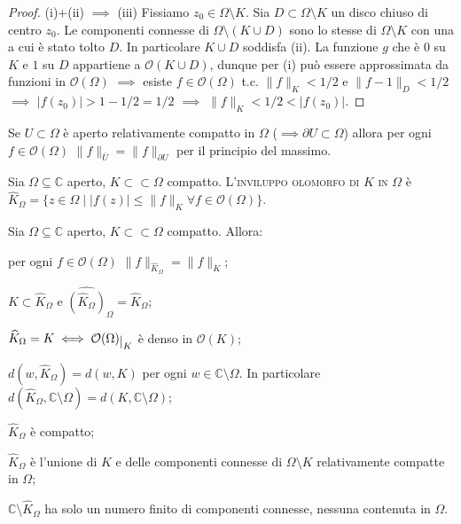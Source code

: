 \begin{proof}
  (i)+(ii) $\implies$ (iii) Fissiamo $z_0 \in \Omega \setminus K$. Sia $D \subset \Omega \setminus K$ un disco chiuso di centro $z_0$. Le componenti connesse di $\Omega \setminus (K \cup D)$ sono lo stesse di $\Omega \setminus K$ con una a cui è stato tolto $D$. In particolare $K \cup D$ soddisfa (ii).
  La funzione $g$ che è $0$ su $K$ e $1$ su $D$ appartiene a $\mathcal{O}(K \cup D)$, dunque per (i) può essere approssimata da funzioni in $\mathcal{O}(\Omega)$ $\implies$ esiste $f \in \mathcal{O}(\Omega)$ t.c. $\|f\|_K<1/2$ e $\|f-1\|_D<1/2$ $\implies$ $|f(z_0)|>1-1/2=1/2$ $\implies$ $\|f\|_K<1/2<|f(z_0)|$.
\end{proof}

\begin{oss}
  Se $U \subset \Omega$ è aperto relativamente compatto in $\Omega$ ($\implies \partial U\subset \Omega$) allora per ogni $f \in \mathcal{O}(\Omega)$ $\|f\|_{\overline{U}}=\|f\|_{\partial U}$ per il principio del massimo.
\end{oss}

\begin{defn}
  Sia $\Omega \subseteq \mathbb{C}$ aperto, $K\subset\subset\Omega$ compatto. L'\textsc{inviluppo olomorfo di $K$ in $\Omega$} è $\widehat{K}_{\Omega}=\{z \in \Omega \mid |f(z)|\le\|f\|_K\forall f \in \mathcal{O}(\Omega)\}$.
\end{defn}

\begin{prop}
  Sia $\Omega \subseteq \mathbb{C}$ aperto, $K\subset\subset\Omega$ compatto. Allora:
  \begin{nlist}
    \item per ogni $f \in \mathcal{O}(\Omega)$ $\|f\|_{\widehat{K}_{\Omega}}=\|f\|_K$;
    \item $K \subset \widehat{K}_{\Omega}$ e $\widehat{(\widehat{K}_\Omega)}_{\Omega}=\widehat{K}_{\Omega}$;
    \item $\widehat{K}_{\Omega}=K \iff \mathcal{O}(\Omega)\restrict{K}$ è denso in $\mathcal{O}(K)$;
    \item $d(w, \widehat{K}_{\Omega})=d(w, K)$ per ogni $w \in \mathbb{C}\setminus\Omega$. In particolare $d(\widehat{K}_{\Omega}, \mathbb{C}\setminus\Omega)=d(K, \mathbb{C}\setminus\Omega)$;
    \item $\widehat{K}_{\Omega}$ è compatto;
    \item $\widehat{K}_{\Omega}$ è l'unione di $K$ e delle componenti connesse di $\Omega \setminus K$ relativamente compatte in $\Omega$;
    \item $\mathbb{C}\setminus \widehat{K}_{\Omega}$ ha solo un numero finito di componenti connesse, nessuna contenuta in $\Omega$.
  \end{nlist}
\end{prop}

